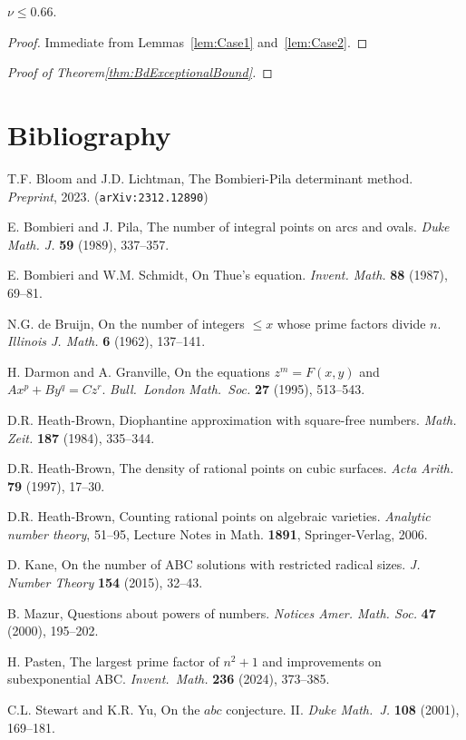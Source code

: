 \begin{theorem}\label{thm:ABCExponentNu}
  \leanok
  $\nu \le 0.66$.
\end{theorem}
\begin{proof}
  \leanok
  Immediate from Lemmas~\ref{lem:Case1} and~\ref{lem:Case2}.
\end{proof}

\begin{proof}[Proof of Theorem\ref{thm:BdExceptionalBound}]
\end{proof}


\chapter{Bibliography}
\begin{thebibliography}{99}

T.F. Bloom and J.D. Lichtman, The Bombieri-Pila determinant method. {\em Preprint}, 2023. ({\tt arXiv:2312.12890})

E. Bombieri and J. Pila, The number of integral points on arcs and ovals. {\em Duke Math. J.} {\bf 59} (1989), 337--357.

E. Bombieri and W.M. Schmidt, On Thue's equation. {\em Invent. Math.} {\bf 88} (1987), 69--81.

N.G. de Bruijn, On the number of integers {$\leq x$} whose prime factors divide {$n$}.  {\em Illinois J. Math.} {\bf 6} (1962), {137--141}.

H. Darmon and A. Granville, On the equations $z^m=F(x,y)$ and $Ax^p+By^q=Cz^r$. {\em Bull.\ London Math.\ Soc.} {\bf 27} (1995), 513--543.

D.R. Heath-Brown, Diophantine approximation with square-free numbers.  {\em Math. Zeit.} {\bf 187} (1984), {335--344}.

D.R. Heath-Brown, The density of rational points on cubic surfaces. {\em Acta Arith.} {\bf 79} (1997), 17--30.

D.R. Heath-Brown, Counting rational points on algebraic varieties. {\em Analytic number theory}, 51--95, Lecture Notes in Math. {\bf 1891}, Springer-Verlag, 2006.

D. Kane, On the number of ABC solutions with restricted radical sizes. {\em J. Number Theory} {\bf 154} (2015), 32--43.

B. Mazur, Questions about powers of numbers. {\em Notices Amer. Math. Soc.} {\bf 47} (2000), 195--202.

H. Pasten, The largest prime factor of $n^2+1$ and improvements on subexponential ABC. {\em Invent.\ Math.} {\bf 236} (2024), 373--385.

C.L. Stewart and K.R. Yu, On the $abc$ conjecture. II. {\it Duke Math.\ J.} {\bf 108} (2001), 169--181.

\end{thebibliography}
